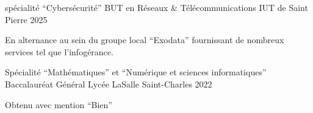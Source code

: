 
\begin{cventries}
  \cventry
    {spécialité ``Cybersécurité''}
    {BUT en Réseaux \& Télécommunications}
    {IUT de Saint Pierre}
    {2025}
    {
      \begin{cvitems}
        \item {En alternance au sein du groupe local ``Exodata'' fournissant de nombreux services tel que l'infogérance.}
      \end{cvitems}
    }

  \cventry
    {Spécialité ``Mathématiques'' et ``Numérique et sciences informatiques''}
    {Baccalauréat Général}
    {Lycée LaSalle Saint-Charles}
    {2022}
    {
      \begin{cvitems}
        \item {Obtenu avec mention ``Bien''}
      \end{cvitems}
    }
\end{cventries}
